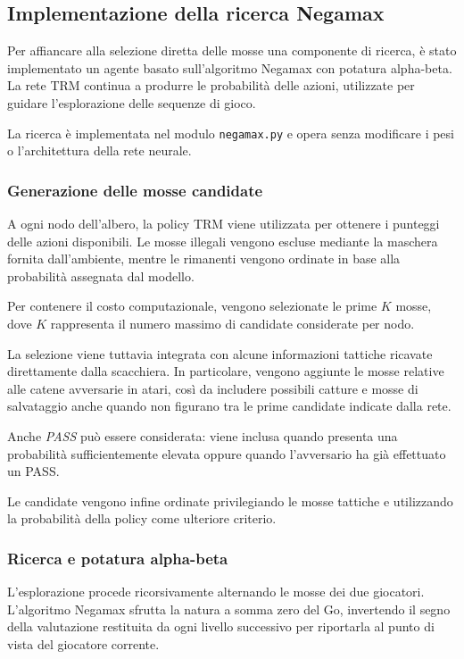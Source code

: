 \subsection{Implementazione della ricerca Negamax}

Per affiancare alla selezione diretta delle mosse una componente di ricerca, è stato implementato un agente basato sull'algoritmo Negamax con potatura alpha-beta. La rete TRM continua a produrre le probabilità delle azioni, utilizzate per guidare l'esplorazione delle sequenze di gioco.

La ricerca è implementata nel modulo \texttt{negamax.py} e opera senza modificare i pesi o l'architettura della rete neurale.

\subsubsection{Generazione delle mosse candidate}

A ogni nodo dell'albero, la policy TRM viene utilizzata per ottenere i punteggi delle azioni disponibili. Le mosse illegali vengono escluse mediante la maschera fornita dall'ambiente, mentre le rimanenti vengono ordinate in base alla probabilità assegnata dal modello.

Per contenere il costo computazionale, vengono selezionate le prime \(K\) mosse, dove \(K\) rappresenta il numero massimo di candidate considerate per nodo.

La selezione viene tuttavia integrata con alcune informazioni tattiche ricavate direttamente dalla scacchiera. In particolare, vengono aggiunte le mosse relative alle catene avversarie in atari, così da includere possibili catture e mosse di salvataggio anche quando non figurano tra le prime candidate indicate dalla rete.

Anche \textit{PASS} può essere considerata: viene inclusa quando presenta una probabilità sufficientemente elevata oppure quando l'avversario ha già effettuato un PASS.

Le candidate vengono infine ordinate privilegiando le mosse tattiche e utilizzando la probabilità della policy come ulteriore criterio.

\subsubsection{Ricerca e potatura alpha-beta}

L'esplorazione procede ricorsivamente alternando le mosse dei due giocatori. L'algoritmo Negamax sfrutta la natura a somma zero del Go, invertendo il segno della valutazione restituita da ogni livello successivo per riportarla al punto di vista del giocatore corrente.

